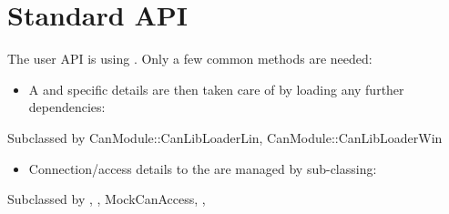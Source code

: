 \documentclass[letterpaper,10pt,english]{sphinxmanual}
\begin{document}
\chapter{Standard API}
\label{\detokenize{standardApi:standard-api}}\label{\detokenize{standardApi::doc}}
The user API is using .
Only a few common methods are needed:
\begin{itemize}
\item {} 
A  and specific details are then taken care of by loading any further dependencies:

\end{itemize}

\begin{fulllineitems}
\label{\detokenize{standardApi:_CPPv4N9CanModule12CanLibLoaderE}}%
\pysigstartmultiline
{}\label{\detokenize{standardApi:classCanModule_1_1CanLibLoader}}%
\pysigstopmultiline
Subclassed by CanModule::CanLibLoaderLin, CanModule::CanLibLoaderWin

\end{fulllineitems}

\begin{itemize}
\item {} 
Connection/access details to the  are managed by sub-classing:

\end{itemize}

\begin{fulllineitems}
\label{\detokenize{standardApi:_CPPv4N9CanModule10CCanAccessE}}%
\pysigstartmultiline
{}\label{\detokenize{standardApi:classCanModule_1_1CCanAccess}}%
\pysigstopmultiline
Subclassed by {\hyperref[\detokenize{vendors/anagate:classAnaCanScan}]{}}, {\hyperref[\detokenize{vendors/systec:classCSockCanScan}]{}}, MockCanAccess, {\hyperref[\detokenize{vendors/peak:classPKCanScan}]{}}, {\hyperref[\detokenize{vendors/systec:classSTCanScan}]{}}

\end{fulllineitems}
\end{document}
